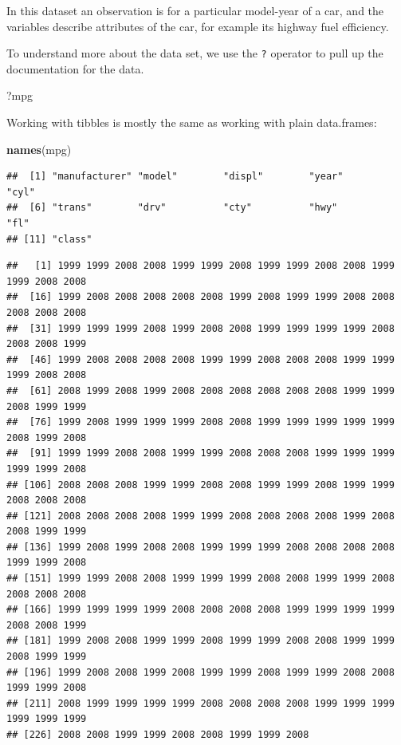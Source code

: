 \documentclass[]{book}
\newenvironment{Shaded}{\begin{snugshade}}{\end{snugshade}}
\newcommand{\KeywordTok}[1]{\textcolor[rgb]{0.13,0.29,0.53}{\textbf{#1}}}
\newcommand{\OperatorTok}[1]{\textcolor[rgb]{0.81,0.36,0.00}{\textbf{#1}}}
\newcommand{\NormalTok}[1]{#1}
\begin{document}
In this dataset an observation is for a particular model-year of a car,
and the variables describe attributes of the car, for example its
highway fuel efficiency.

To understand more about the data set, we use the \texttt{?} operator to
pull up the documentation for the data.

\begin{Shaded}
\begin{Highlighting}[]
\NormalTok{?mpg}
\end{Highlighting}
\end{Shaded}

Working with tibbles is mostly the same as working with plain
data.frames:

\begin{Shaded}
\begin{Highlighting}[]
\KeywordTok{names}\NormalTok{(mpg)}
\end{Highlighting}
\end{Shaded}

\begin{verbatim}
##  [1] "manufacturer" "model"        "displ"        "year"         "cyl"         
##  [6] "trans"        "drv"          "cty"          "hwy"          "fl"          
## [11] "class"
\end{verbatim}

\begin{Shaded}
\end{Shaded}

\begin{verbatim}
##   [1] 1999 1999 2008 2008 1999 1999 2008 1999 1999 2008 2008 1999 1999 2008 2008
##  [16] 1999 2008 2008 2008 2008 2008 1999 2008 1999 1999 2008 2008 2008 2008 2008
##  [31] 1999 1999 1999 2008 1999 2008 2008 1999 1999 1999 1999 2008 2008 2008 1999
##  [46] 1999 2008 2008 2008 2008 1999 1999 2008 2008 2008 1999 1999 1999 2008 2008
##  [61] 2008 1999 2008 1999 2008 2008 2008 2008 2008 2008 1999 1999 2008 1999 1999
##  [76] 1999 2008 1999 1999 1999 2008 2008 1999 1999 1999 1999 1999 2008 1999 2008
##  [91] 1999 1999 2008 2008 1999 1999 2008 2008 2008 1999 1999 1999 1999 1999 2008
## [106] 2008 2008 2008 1999 1999 2008 2008 1999 1999 2008 1999 1999 2008 2008 2008
## [121] 2008 2008 2008 2008 1999 1999 2008 2008 2008 2008 1999 2008 2008 1999 1999
## [136] 1999 2008 1999 2008 2008 1999 1999 1999 2008 2008 2008 2008 1999 1999 2008
## [151] 1999 1999 2008 2008 1999 1999 1999 2008 2008 1999 1999 2008 2008 2008 2008
## [166] 1999 1999 1999 1999 2008 2008 2008 2008 1999 1999 1999 1999 2008 2008 1999
## [181] 1999 2008 2008 1999 1999 2008 1999 1999 2008 2008 1999 1999 2008 1999 1999
## [196] 1999 2008 2008 1999 2008 1999 1999 2008 1999 1999 2008 2008 1999 1999 2008
## [211] 2008 1999 1999 1999 1999 2008 2008 2008 2008 1999 1999 1999 1999 1999 1999
## [226] 2008 2008 1999 1999 2008 2008 1999 1999 2008
\end{verbatim}
\end{document}
